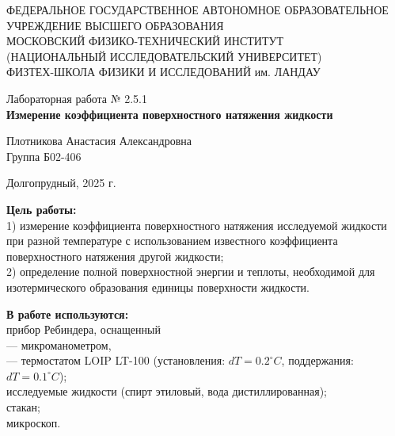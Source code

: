 \documentclass[a4paper,12pt]{article} %
\begin{document}
\begin{center}
	\footnotesize{ФЕДЕРАЛЬНОЕ ГОСУДАРСТВЕННОЕ АВТОНОМНОЕ ОБРАЗОВАТЕЛЬНОЕ 			УЧРЕЖДЕНИЕ ВЫСШЕГО ОБРАЗОВАНИЯ}\\
	\footnotesize{МОСКОВСКИЙ ФИЗИКО-ТЕХНИЧЕСКИЙ ИНСТИТУТ\\(НАЦИОНАЛЬНЫЙ 			ИССЛЕДОВАТЕЛЬСКИЙ УНИВЕРСИТЕТ)}\\
	\footnotesize{ФИЗТЕХ-ШКОЛА ФИЗИКИ И ИССЛЕДОВАНИЙ им. ЛАНДАУ\\}
	\hfill \break
	\hfill \break
	\hfill \break
	\hfill \break
\end{center}

\begin{center}   
    \hfill \break
	\hfill \break
	\hfill \break
	\hfill \break    \hfill \break
	\hfill \break
	\hfill \break
	\hfill \break
    \hfill \break
    \hfill \break
	\hfill \break
	\large{Лабораторная работа № 2.5.1 \\\textbf{Измерение коэффициента поверхностного натяжения
  жидкости}}\\
	\begin{flushright}
		Плотникова Анастасия Александровна\\
		Группа Б02-406
	\end{flushright}
	\hfill \break
	\hfill \break
	\hfill \break
\end{center}
\hfill \break
\hfill \break
\hfill \break
\hfill \break
\hfill \break
\hfill \break
\hfill \break
\hfill \break
\hfill \break
\hfill \break
\hfill \break
\hfill \break
\hfill \break
\begin{center}
	Долгопрудный, 2025 г.
\end{center}
\thispagestyle{empty}
\newpage
	\textbf{Цель работы:}\\ 
  1) измерение коэффициента поверхностного натяжения исследуемой жидкости при разной температуре с использованием известного коэффициента поверхностного натяжения другой жидкости; \\
  2) определение полной поверхностной энергии и теплоты, необходимой для изотермического образования единицы поверхности жидкости.
	\hfill \break
	
	\textbf{В работе используются:}\\ 
  прибор Ребиндера, оснащенный \\
  — микроманометром, \\
  — термостатом LOIP LT-100 (установления: $dT = 0.2 ^\circ C$, поддержания: $dT = 0.1 ^\circ C$); \\
  исследуемые жидкости (спирт этиловый, вода дистиллированная); \\
  стакан; \\
  микроскоп.
	
\end{document}
